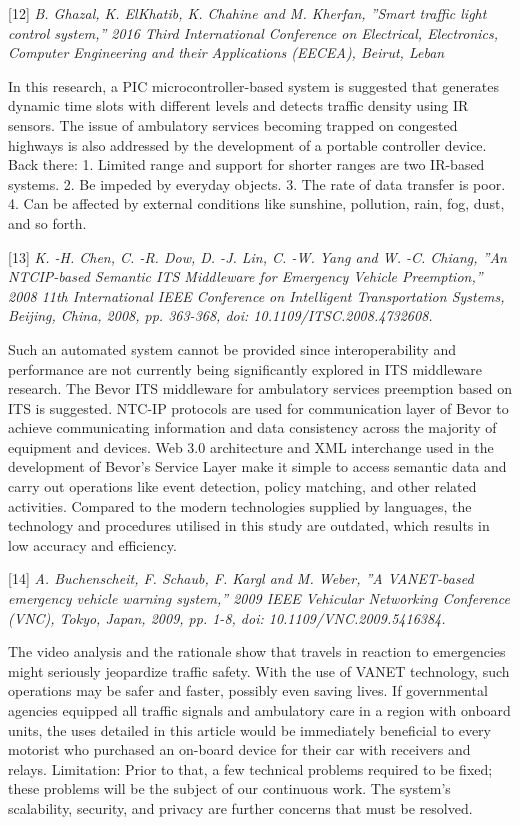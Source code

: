 \documentclass[conference]{IEEEtran}
\begin{document}
[12]\emph{ B. Ghazal, K. ElKhatib, K. Chahine and M. Kherfan,
”Smart traffic light control system,” 2016 Third International
Conference on Electrical, Electronics, Computer Engineering
and their Applications (EECEA), Beirut, Leban }

In this research, a PIC microcontroller-based system is suggested that generates dynamic time slots with different levels and detects traffic density using IR sensors. The issue of ambulatory services becoming trapped on congested highways is also addressed by the development of a portable controller device.
Back there: 1. Limited range and support for shorter ranges are two IR-based systems.
2. Be impeded by everyday objects.
3. The rate of data transfer is poor.
4. Can be affected by external conditions like sunshine, pollution, rain, fog, dust, and so forth.

[13]\emph{ K. -H. Chen, C. -R. Dow, D. -J. Lin, C. -W.
Yang and W. -C. Chiang, ”An NTCIP-based Semantic
ITS Middleware for Emergency Vehicle Preemption,” 2008
11th International IEEE Conference on Intelligent Transportation Systems, Beijing, China, 2008, pp. 363-368, doi:
10.1109/ITSC.2008.4732608. }

Such an automated system cannot be provided since interoperability and performance are not currently being significantly explored in ITS middleware research. The Bevor ITS middleware for ambulatory services preemption based on ITS is suggested. NTC-IP protocols are used for communication layer of Bevor to achieve communicating information and data consistency across the majority of equipment and devices. Web 3.0 architecture and XML interchange used in the development of Bevor's Service Layer make it simple to access semantic data and carry out operations like event detection, policy matching, and other related activities.
Compared to the modern technologies supplied by languages, the technology and procedures utilised in this study are outdated, which results in low accuracy and efficiency.

[14]\emph{ A. Buchenscheit, F. Schaub, F. Kargl and M. Weber,
”A VANET-based emergency vehicle warning system,” 2009
IEEE Vehicular Networking Conference (VNC), Tokyo, Japan,
2009, pp. 1-8, doi: 10.1109/VNC.2009.5416384. }

The video analysis and the rationale show that travels in reaction to emergencies might seriously jeopardize traffic safety. With the use of VANET technology, such operations may be safer and faster, possibly even saving lives. If governmental agencies equipped all traffic signals and ambulatory care in a region with onboard units, the uses detailed in this article would be immediately beneficial to every motorist who purchased an on-board device for their car with receivers and relays. 
Limitation: Prior to that, a few technical problems required to be fixed; these problems will be the subject of our continuous work. The system's scalability, security, and privacy are further concerns that must be resolved.
\end{document}
